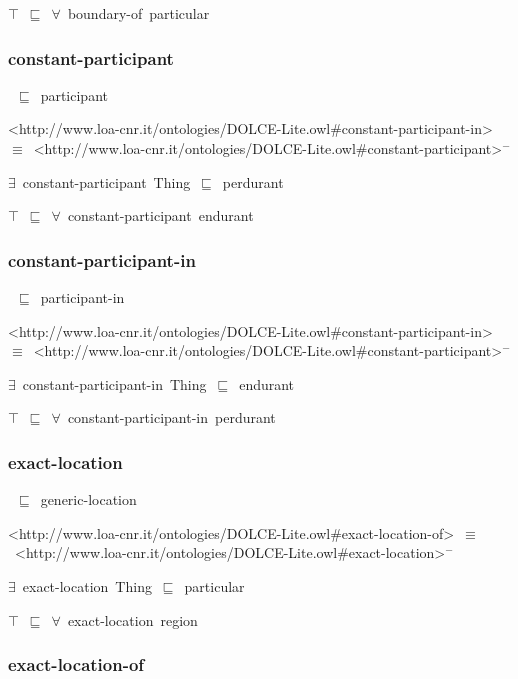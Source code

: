 \documentclass{article}
\begin{document}
\ensuremath{\top}~\ensuremath{\sqsubseteq}~\ensuremath{\forall}~boundary-of~particular

\subsubsection*{constant-participant}

~\ensuremath{\sqsubseteq}~participant

<http://www.loa-cnr.it/ontologies/DOLCE-Lite.owl#constant-participant-in>~\ensuremath{\equiv}~<http://www.loa-cnr.it/ontologies/DOLCE-Lite.owl#constant-participant>\ensuremath{^-}

\ensuremath{\exists}~constant-participant~Thing~\ensuremath{\sqsubseteq}~perdurant

\ensuremath{\top}~\ensuremath{\sqsubseteq}~\ensuremath{\forall}~constant-participant~endurant

\subsubsection*{constant-participant-in}

~\ensuremath{\sqsubseteq}~participant-in

<http://www.loa-cnr.it/ontologies/DOLCE-Lite.owl#constant-participant-in>~\ensuremath{\equiv}~<http://www.loa-cnr.it/ontologies/DOLCE-Lite.owl#constant-participant>\ensuremath{^-}

\ensuremath{\exists}~constant-participant-in~Thing~\ensuremath{\sqsubseteq}~endurant

\ensuremath{\top}~\ensuremath{\sqsubseteq}~\ensuremath{\forall}~constant-participant-in~perdurant

\subsubsection*{exact-location}

~\ensuremath{\sqsubseteq}~generic-location

<http://www.loa-cnr.it/ontologies/DOLCE-Lite.owl#exact-location-of>~\ensuremath{\equiv}~<http://www.loa-cnr.it/ontologies/DOLCE-Lite.owl#exact-location>\ensuremath{^-}

\ensuremath{\exists}~exact-location~Thing~\ensuremath{\sqsubseteq}~particular

\ensuremath{\top}~\ensuremath{\sqsubseteq}~\ensuremath{\forall}~exact-location~region

\subsubsection*{exact-location-of}
\end{document}
